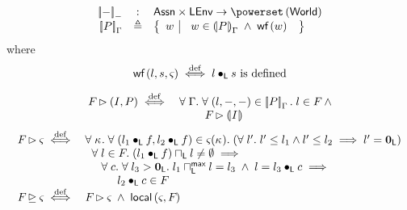 \begin{definition}
\[%
\]
%
%
%
%
%
\end{definition}
%
%
\begin{definition}
%
\[
\begin{array}{r c l}
\sem[-]{-} & : & \Assertions \times \LEnv \rightarrow \pset{\Worlds} \\

\sem{P} & \eqdef & 
\left\{
\begin{array}{l | l}
 w &
 \begin{array}{l}
 	 w \in \intermediateSem{P} \;\land\;
 	 \wf{w}
 	\end{array} 
\end{array}
\right\}\\
\end{array}
\]
%
where 
%
\[
	\wf{l, s, \amod{}} \iffdef l \composeL s  \text{ is defined}
\]
%
\end{definition}
%
\[
\begin{array}{r l}
 \fence{} \fences (I, P) \iffdef & 
 \for{\lenv} \for{(l, -, -) \in \sem[\lenv]{P}} l  \in \fence{} \;\land\\
 & \hspace*{0.8cm} \fence{} \fences \intermediateSemI{I}
\end{array}
\]
% 
\[ 
\begin{array}{r l}
  \fence{} \fences \amod{} \iffdef 
 & \for{\ca{}} \for {(l_1 \composeL f, l_2 \composeL f) \in \amod{}(\ca{})} (\for{l'} l' \leq l_1 \land l' \leq l_2 \implies l' = \unitL ) \\
 & \hspace*{0.2cm} \for{l \in \fence{}} (l_1 \composeL f) \meetL l \not= \emptyset \implies \\
 & \hspace*{0.5cm} \for{c} \for{l_3 > \unitL} l_1 \maxMeetL l = l_3 \;\land\; l = l_3 \composeL c\implies\\
 & \hspace*{1cm} l_2 \composeL c \in \fence{}\\



	 \fence{} \strictfences \amod{} \iffdef
 		& \fence{} \fences \amod{} \;\land\; \local{\amod{}}{\fence{}}
\end{array}
\]
